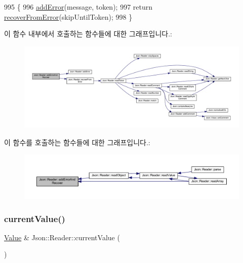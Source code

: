 \begin{DoxyCode}
995                                                           \{
996   \hyperlink{class_json_1_1_reader_af02176a1d2786b4415bbb00a1b10bb6b}{addError}(message, token);
997   \textcolor{keywordflow}{return} \hyperlink{class_json_1_1_reader_a8d4ed03a43082c5ace81ba5b81425eaf}{recoverFromError}(skipUntilToken);
998 \}
\end{DoxyCode}
이 함수 내부에서 호출하는 함수들에 대한 그래프입니다.\+:\nopagebreak
\begin{figure}[H]
\begin{center}
\leavevmode
\includegraphics[width=350pt]{class_json_1_1_reader_a478db8ac6d00db1409608a37b66bc38d_cgraph}
\end{center}
\end{figure}
이 함수를 호출하는 함수들에 대한 그래프입니다.\+:\nopagebreak
\begin{figure}[H]
\begin{center}
\leavevmode
\includegraphics[width=350pt]{class_json_1_1_reader_a478db8ac6d00db1409608a37b66bc38d_icgraph}
\end{center}
\end{figure}
\mbox{\label{class_json_1_1_reader_a85597f763fb0148a17359b6dfc6f7326}} 
\subsubsection{\texorpdfstring{current\+Value()}{currentValue()}}
{\footnotesize\ttfamily \hyperlink{class_json_1_1_value}{Value} \& Json\+::\+Reader\+::current\+Value (\begin{DoxyParamCaption}{ }\end{DoxyParamCaption})\hspace{0.3cm}{\ttfamily [private]}}



